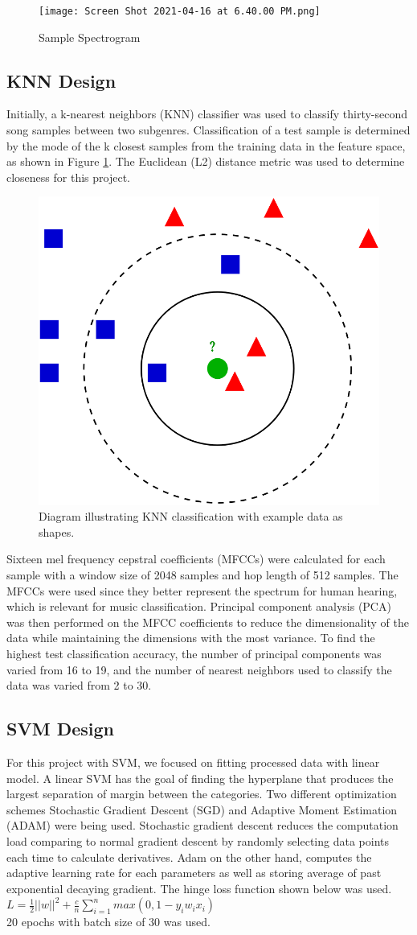 \documentclass[letterpaper, 12 pt, conference]{ieeeconf}  %
\begin{document}
\begin{figure}
  \texttt{[image: Screen Shot 2021-04-16 at 6.40.00 PM.png]}
  \caption{Sample Spectrogram}
\end{figure}


\subsection{KNN Design}

Initially, a k-nearest neighbors (KNN) classifier was used to classify thirty-second song samples between two subgenres. 
Classification of a test sample is determined by the mode of the k closest samples from the training data in the feature space, as shown in Figure \ref{fig:knnimg}. The Euclidean (L2) distance metric was used to determine closeness for this project.
\begin{figure}[!ht]
  \centering
  \includegraphics[width=.3\textwidth]{knn_graphic.png}
  \caption{Diagram illustrating KNN classification with example data as shapes.}
  \label{fig:knnimg}
\end{figure}

Sixteen mel frequency cepstral coefficients (MFCCs) were calculated for each sample with a window size of 2048 samples and hop length of 512 samples. The MFCCs were used since they better represent the spectrum for human hearing, which is relevant for music classification. Principal component analysis (PCA) was then performed on the MFCC coefficients to reduce the dimensionality of the data while maintaining the dimensions with the most variance. To find the highest test classification accuracy, the number of principal components was varied from 16 to 19, and the number of nearest neighbors used to classify the data was varied from 2 to 30. 

\subsection{SVM Design}
For this project with SVM, we focused on fitting processed data with linear model. A linear SVM has the goal of finding the hyperplane that produces the largest separation of margin between the categories. Two different optimization schemes Stochastic Gradient Descent (SGD) and Adaptive Moment Estimation (ADAM) were being used. Stochastic gradient descent reduces the computation load comparing to normal gradient descent by randomly selecting data points each time to calculate derivatives. Adam on the other hand, computes the adaptive learning rate for each parameters as well as storing average of past exponential decaying gradient. The hinge loss function shown below was used.\\
$L = \frac{1}{2} ||w||^2 + \frac{c}{n}\sum_{i=1}^{n}max(0,1-y_iw_ix_i) $\\
20 epochs with batch size of 30 was used. 
\end{document}
